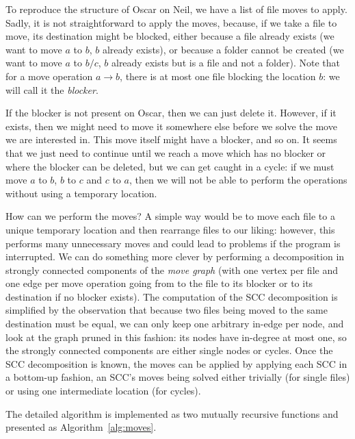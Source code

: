 \documentclass[11pt]{llncs}
\begin{document}
To reproduce the structure of Oscar on Neil, we have a list of file moves to
apply. Sadly, it is not straightforward to apply the moves, because, if we take
a file to move, its destination might be blocked, either because a file already
exists (we want to move $a$ to $b$, $b$ already exists), or because a folder
cannot be created (we want to move $a$ to $b/c$, $b$ already exists but is a
file and not a folder). Note that for a move operation $a \rightarrow b$, there
is at most one file blocking the location $b$: we will call it the
\emph{blocker}.

If the blocker is not present on Oscar, then we can just delete it. However, if
it exists, then we might need to move it somewhere else before we solve the move
we are interested in. This move itself might have a blocker, and so on. It seems
that we just need to continue until we reach a move which has no blocker or
where the blocker can be deleted, but we can get caught in a cycle: if we must
move $a$ to $b$, $b$ to $c$ and $c$ to $a$, then we will not be able to perform
the operations without using a temporary location.

How can we perform the moves? A simple way would be to move each file to a
unique temporary location and then rearrange files to our liking: however, this
performs many unnecessary moves and could lead to problems if the program is
interrupted. We can do something more clever by performing a decomposition in
strongly connected components of the \emph{move graph} (with one vertex per file
and one edge per move operation going from to the file to its blocker or to its
destination if no blocker exists). The computation of the SCC decomposition is
simplified by the observation that because two files being moved to the same
destination must be equal, we can only keep one arbitrary in-edge per node, and
look at the graph pruned in this fashion: its nodes have in-degree at most one,
so the strongly connected components are either single nodes or cycles. Once the
SCC decomposition is known, the moves can be applied by applying each SCC in a
bottom-up fashion, an SCC's moves being solved either trivially (for single
files) or using one intermediate location (for cycles).

The detailed algorithm is implemented as two mutually recursive functions and
presented as Algorithm~\ref{alg:moves}.
\end{document}
